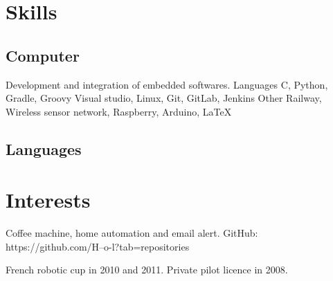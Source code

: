 \documentclass[10pt,a4paper]{moderncv}
\begin{document}
\section{Skills}

	\subsection{Computer}

		{Development and integration of embedded softwares.\newline{}}
		{Languages}
		{C, Python, Gradle, Groovy}
		{Visual studio, Linux, Git, GitLab, Jenkins\newline{}}
		{Other}
		{Railway, Wireless sensor network, Raspberry, Arduino, \LaTeX} 

	\subsection{Languages}


\section{Interests}
      {\small Coffee machine, home automation and email alert.\newline{}
              GitHub: https://github.com/H--o-l?tab=repositories\newline{}}

      {\small French robotic cup in 2010 and 2011.\newline{}
              Private pilot licence in 2008.}
\end{document}
